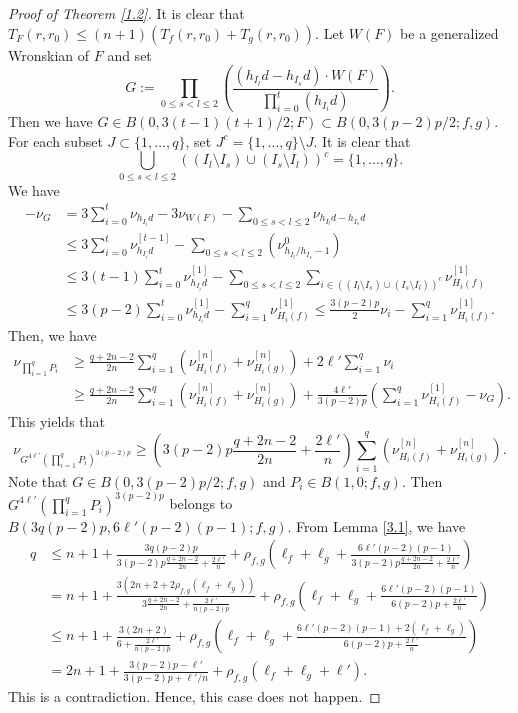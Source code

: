 \documentclass[12pt, a4paper, oneside]{amsart}
\numberwithin{equation}{section}
\begin{document}
\begin{proof}[Proof of Theorem \ref{1.2}]
It is clear that $T_F(r,r_0)\le (n+1)(T_{f}(r,r_0)+T_{g}(r,r_0))$. Let $W(F)$ be a generalized Wronskian of $F$ and set 
$$G:=\prod_{0\le s<l\le 2}\left (\dfrac{(h_{I_l}d-h_{I_s}d)\cdot W(F)}{\prod_{i=0}^t(h_{I_i}d)}\right ).$$
Then we have $G\in B(0,3(t-1)(t+1)/2;F)\subset B(0,3(p-2)p/2;f,g)$. For each subset $J\subset\{1,\ldots,q\}$, set $J^c=\{1,\ldots,q\}\setminus J$. It is clear that 
$$\bigcup_{0\le s<l\le 2}((I_l\setminus I_s)\cup (I_s\setminus I_l))^c=\{1,\ldots,q\}.$$
We have
\begin{align*}
-\nu_G&=3\sum_{i=0}^t\nu_{h_{I_i}d}-3\nu_{W(F)}-\sum_{0\le s<l\le 2}\nu_{h_{I_l}d-h_{I_s}d}\\
&\le 3\sum_{i=0}^t\nu_{h_{I_i}d}^{[t-1]}- \sum_{0\le s<l\le 2}(\nu^0_{h_{I_l}/h_{I_s}-1})\\
&\le 3(t-1)\sum_{i=0}^t\nu_{h_{I_i}d}^{[1]}- \sum_{0\le s<l\le 2}\sum_{i\in ((I_l\setminus I_s)\cup (I_s\setminus I_l))^c}\nu^{[1]}_{H_i(f)}\\
&\le 3(p-2)\sum_{i=0}^t\nu_{h_{I_i}d}^{[1]}- \sum_{i=1}^q\nu^{[1]}_{H_i(f)}\le \frac{3(p-2)p}{2}\nu_i-\sum_{i=1}^q\nu^{[1]}_{H_i(f)}.
\end{align*}
Then, we have
\begin{align*}
\nu_{\prod_{i=1}^qP_i} &\ge\frac{q+2n-2}{2n}\sum_{i=1}^{q}(\nu_{H_i(f)}^{[n]}+\nu_{H_i(g)}^{[n]})+2\ell' \sum_{i=1}^{q}\nu_i\\
&\ge \frac{q+2n-2}{2n}\sum_{i=1}^{q}\left (\nu_{H_i(f)}^{[n]}+\nu_{H_i(g)}^{[n]}\right )+\frac{4\ell'}{3(p-2)p}\left (\sum_{i=1}^q\nu^{[1]}_{H_i(f)}-\nu_G\right).
\end{align*}
This yields that
$$ \nu_{G^{4\ell'} (\prod_{i=1}^qP_i)^{3(p-2)p}}\ge  \left(3(p-2)p\frac{q+2n-2}{2n}+\frac{2\ell'}{n}\right)\sum_{i=1}^{q}\left (\nu_{H_i(f)}^{[n]}+\nu_{H_i(g)}^{[n]}\right).$$
Note that $G\in B(0,3(p-2)p/2;f,g)$ and $P_i\in B(1,0;f,g)$. Then $G^{4\ell'}(\prod_{i=1}^qP_i)^{3(p-2)p}$ belongs to $B(3q(p-2)p,6\ell' (p-2)(p-1);f,g)$. From Lemma \ref{3.1}, we have
\begin{align*}
q&\le n+1+\frac{3q(p-2)p}{3(p-2)p\frac{q+2n-2}{2n}+\frac{2\ell'}{n}}+\rho_{f,g}\left(\ell_f+\ell_g+\frac{6\ell'(p-2)(p-1)}{3(p-2)p\frac{q+2n-2}{2n}+\frac{2\ell'}{n}}\right)\\
&=n+1+\frac{3(2n+2+2\rho_{f,g}(\ell_f+\ell_g))}{3\frac{q+2n-2}{2n}+\frac{2\ell'}{n(p-2)p}}+\rho_{f,g}\left(\ell_f+\ell_g+\frac{6\ell'(p-2)(p-1)}{6(p-2)p+\frac{2\ell'}{n}}\right)\\
&\le n+1+\frac{3(2n+2)}{6+\frac{2\ell'}{n(p-2)p}}+\rho_{f,g}\left(\ell_f+\ell_g+\frac{6\ell'(p-2)(p-1)+2(\ell_f+\ell_g)}{6(p-2)p+\frac{2\ell'}{n}}\right)\\
&=2n+1+\frac{3(p-2)p-\ell'}{3(p-2)p+\ell'/n}+\rho_{f,g}\left(\ell_f+\ell_g+\ell'\right).
\end{align*}
This is a contradiction. Hence, this case does not happen.


\end{proof}
\end{document}
